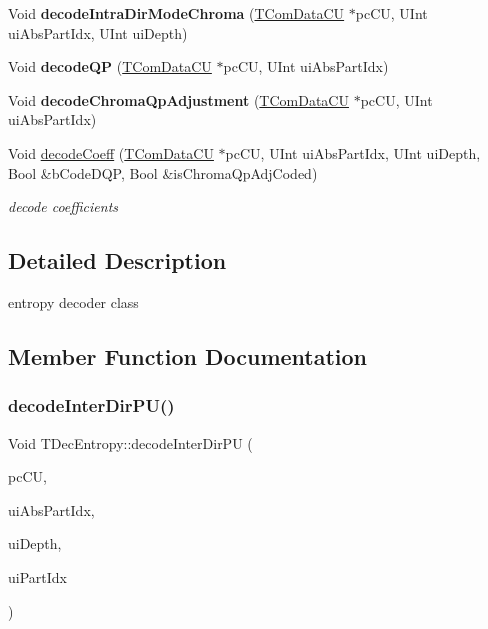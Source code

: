 \begin{DoxyCompactItemize}
\item 
\mbox{\label{class_t_dec_entropy_aca7f679b69a345e6767d1b32f1e4db35}} 
Void {\bfseries decode\+Intra\+Dir\+Mode\+Chroma} (\hyperlink{class_t_com_data_c_u}{T\+Com\+Data\+CU} $\ast$pc\+CU, U\+Int ui\+Abs\+Part\+Idx, U\+Int ui\+Depth)
\item 
\mbox{\label{class_t_dec_entropy_a077729e7f7f7e668803f3705af40989c}} 
Void {\bfseries decode\+QP} (\hyperlink{class_t_com_data_c_u}{T\+Com\+Data\+CU} $\ast$pc\+CU, U\+Int ui\+Abs\+Part\+Idx)
\item 
\mbox{\label{class_t_dec_entropy_a37c3ac072b3dca6f3d2495ec0ea8bde1}} 
Void {\bfseries decode\+Chroma\+Qp\+Adjustment} (\hyperlink{class_t_com_data_c_u}{T\+Com\+Data\+CU} $\ast$pc\+CU, U\+Int ui\+Abs\+Part\+Idx)
\item 
\mbox{\label{class_t_dec_entropy_a762167ad1b67fba503ed78168f77022e}} 
Void \hyperlink{class_t_dec_entropy_a762167ad1b67fba503ed78168f77022e}{decode\+Coeff} (\hyperlink{class_t_com_data_c_u}{T\+Com\+Data\+CU} $\ast$pc\+CU, U\+Int ui\+Abs\+Part\+Idx, U\+Int ui\+Depth, Bool \&b\+Code\+D\+QP, Bool \&is\+Chroma\+Qp\+Adj\+Coded)
\begin{DoxyCompactList}\small\item\em decode coefficients \end{DoxyCompactList}\end{DoxyCompactItemize}


\subsection{Detailed Description}
entropy decoder class 

\subsection{Member Function Documentation}
\mbox{\label{class_t_dec_entropy_a921b5de984e008dbaad5cad333a530e4}} 
\subsubsection{\texorpdfstring{decode\+Inter\+Dir\+P\+U()}{decodeInterDirPU()}}
{\footnotesize\ttfamily Void T\+Dec\+Entropy\+::decode\+Inter\+Dir\+PU (\begin{DoxyParamCaption}\item[{\hyperlink{class_t_com_data_c_u}{T\+Com\+Data\+CU} $\ast$}]{pc\+CU,  }\item[{U\+Int}]{ui\+Abs\+Part\+Idx,  }\item[{U\+Int}]{ui\+Depth,  }\item[{U\+Int}]{ui\+Part\+Idx }\end{DoxyParamCaption})}

